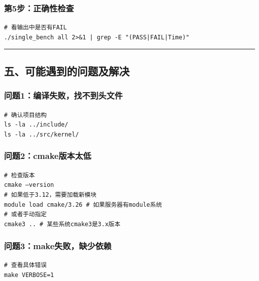 \documentclass[11pt, a4paper]{article}
\begin{document}
\begin{aibox}
\subsubsection*{第5步：正确性检查}
\begin{tcolorbox}[colback=white,colframe=gray!50!white,boxrule=0.5pt,arc=2pt,left=5pt,right=5pt,top=5pt,bottom=5pt]
\texttt{\# 看输出中是否有FAIL}\\
\texttt{./single\_bench all 2>\&1 | grep -E "(PASS|FAIL|Time)"}
\end{tcolorbox}

\begin{center}\rule{\textwidth}{0.4pt}\end{center}

\subsection*{五、可能遇到的问题及解决}

\subsubsection*{问题1：编译失败，找不到头文件}
\begin{tcolorbox}[colback=white,colframe=gray!50!white,boxrule=0.5pt,arc=2pt,left=5pt,right=5pt,top=5pt,bottom=5pt]
\texttt{\# 确认项目结构}\\
\texttt{ls -la ../include/}\\
\texttt{ls -la ../src/kernel/}
\end{tcolorbox}

\subsubsection*{问题2：cmake版本太低}
\begin{tcolorbox}[colback=white,colframe=gray!50!white,boxrule=0.5pt,arc=2pt,left=5pt,right=5pt,top=5pt,bottom=5pt]
\texttt{\# 检查版本}\\
\texttt{cmake --version}\\[0.5em]
\texttt{\# 如果低于3.12，需要加载新模块}\\
\texttt{module load cmake/3.26  \# 如果服务器有module系统}\\
\texttt{\# 或者手动指定}\\
\texttt{cmake3 ..  \# 某些系统cmake3是3.x版本}
\end{tcolorbox}

\subsubsection*{问题3：make失败，缺少依赖}
\begin{tcolorbox}[colback=white,colframe=gray!50!white,boxrule=0.5pt,arc=2pt,left=5pt,right=5pt,top=5pt,bottom=5pt]
\texttt{\# 查看具体错误}\\
\texttt{make VERBOSE=1}
\end{tcolorbox}


\end{aibox}
\end{document}
